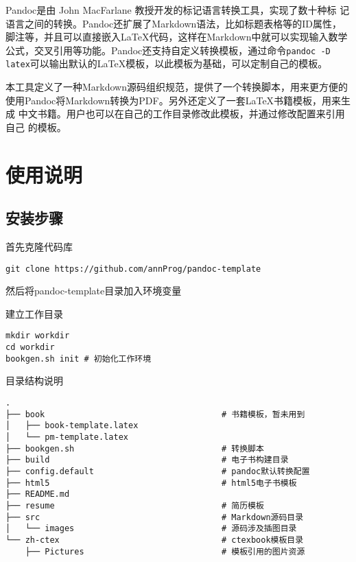 \documentclass[fancyhdr,bookmark]{ctexbook}
\begin{document}
Pandoc是由 John MacFarlane 教授开发的标记语言转换工具，实现了数十种标
记语言之间的转换。Pandoc还扩展了Markdown语法，比如标题表格等的ID属性，
脚注等，并且可以直接嵌入LaTeX代码，这样在Markdown中就可以实现输入数学
公式，交叉引用等功能。Pandoc还支持自定义转换模板，通过命令\lstinline!pandoc -D latex!可以输出默认的LaTeX模板，以此模板为基础，可以定制自己的模板。

本工具定义了一种Markdown源码组织规范，提供了一个转换脚本，用来更方便的
使用Pandoc将Markdown转换为PDF。另外还定义了一套LaTeX书籍模板，用来生成
中文书籍。用户也可以在自己的工作目录修改此模板，并通过修改配置来引用自己
的模板。


{
\hypersetup{linkcolor=black}
\setcounter{tocdepth}{2}
\tableofcontents
{}
}
\listoftables
{}
\listoffigures
{}



\mainmatter
\chapter{使用说明}\label{ux4f7fux7528ux8bf4ux660e}

\section{安装步骤}\label{ux5b89ux88c5ux6b65ux9aa4}

首先克隆代码库

\begin{lstlisting}
git clone https://github.com/annProg/pandoc-template
\end{lstlisting}

然后将pandoc-template目录加入环境变量

建立工作目录

\begin{lstlisting}
mkdir workdir
cd workdir
bookgen.sh init # 初始化工作环境
\end{lstlisting}

目录结构说明

\begin{lstlisting}
.
├── book                                    # 书籍模板，暂未用到
│   ├── book-template.latex
│   └── pm-template.latex
├── bookgen.sh                              # 转换脚本
├── build                                   # 电子书构建目录
├── config.default                          # pandoc默认转换配置
├── html5                                   # html5电子书模板
├── README.md
├── resume                                  # 简历模板
├── src                                     # Markdown源码目录
│   └── images                              # 源码涉及插图目录
└── zh-ctex                                 # ctexbook模板目录
    ├── Pictures                            # 模板引用的图片资源
\end{lstlisting}
\end{document}
